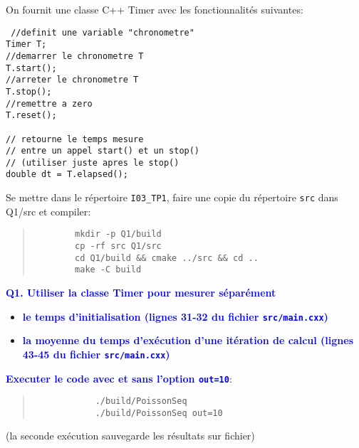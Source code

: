 \documentclass{beamer}
\begin{document}
\begin{frame}[fragile]
On fournit une classe C++ Timer
avec les fonctionnalités suivantes:

\begin{lstlisting}
 //definit une variable "chronometre"
Timer T; 
//demarrer le chronometre T
T.start();
//arreter le chronometre T
T.stop();
//remettre a zero
T.reset();

// retourne le temps mesure 
// entre un appel start() et un stop()
// (utiliser juste apres le stop()
double dt = T.elapsed(); 
\end{lstlisting}

\end{frame}

\begin{frame}[fragile]
	\vfill
	Se mettre dans le r\'epertoire {\tt I03\_TP1}, faire une copie du r\'epertoire {\tt src} dans {Q1/src} et compiler:
	\begin{quote}
		\begin{verbatim}
		mkdir -p Q1/build
		cp -rf src Q1/src
		cd Q1/build && cmake ../src && cd ..
		make -C build
		\end{verbatim}
	\end{quote}

	\vfill
	\textcolor{blue}{\bf Q1. Utiliser la classe Timer pour mesurer s\'epar\'ement}
	\begin{itemize}
		\item \textcolor{blue}{\bf le temps d'initialisation (lignes 31-32 du fichier {\tt src/main.cxx})}
		\item \textcolor{blue}{\bf la moyenne du temps d'ex\'ecution d'une it\'eration de calcul (lignes 43-45 du fichier {\tt src/main.cxx})}
	\end{itemize}

	\textcolor{blue}{\bf Executer le code avec et sans l'option {\tt out=10}}:
	\begin{quote}
		\color{blue}
		\begin{verbatim}
			./build/PoissonSeq
			./build/PoissonSeq out=10
		\end{verbatim}
	\end{quote}
    (la seconde ex\'ecution sauvegarde les r\'esultats sur fichier)
	

\vfill
\end{frame}
\end{document}
